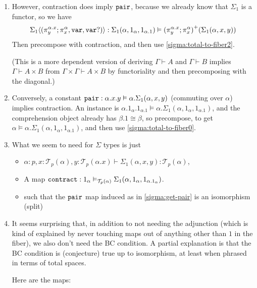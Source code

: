 \documentclass[10pt]{article}
\theoremstyle{definition}
\newcommand\TrPlus[2]{\ensuremath{{#1}^+(#2)}}
\newcommand\El[2]{\mathcal{T}_{#1}(#2)}
\newcommand\ap[2]{\ensuremath{#1 \langle #2 \rangle }}
\begin{document}
\begin{enumerate}
\item \label{sigma:get-pair} However, contraction does imply
  $\mathtt{pair}$, because we already know that $\Sigma_1$ is a functor, so
  we have
  \[
  \ap{\Sigma_1}{(\pi^{\alpha.x}_y;\pi^\alpha_x, \mtt{var}, \mtt{var}?)} :
  \Sigma_1(\alpha,1_\alpha,1_{\alpha.1}) \vDash \TrPlus{(\pi^{\alpha.x}_y;\pi^\alpha_x)}{\Sigma_1(\alpha,x,y)}
  \]
  Then precompose with contraction, and then use
  \ref{sigma:total-to-fiber2}.

  (This is a more dependent version of deriving $\Gamma \vdash A$ and
  $\Gamma \vdash B$ implies $\Gamma \vdash A \times B$ from $\Gamma
  \times \Gamma \vdash A \times B$ by functoriality and then
  precomposing with the diagonal.)
  
\item Conversely, a constant $\mathtt{pair} : \alpha.x.y \vDash
  \alpha.\Sigma_1(\alpha,x,y)$ (commuting over $\alpha$) implies
  contraction. An instance is $\alpha.1_{\alpha}.1_{\alpha.1} \vDash
  \alpha.\Sigma_1(\alpha,1_\alpha,1_{\alpha.1})$, and the comprehension
  object already has $\beta.1 \cong \beta$, so precompose, to get
  $\alpha \vDash \alpha.\Sigma_1(\alpha,1_\alpha,1_{\alpha.1})$, and
  then use \ref{sigma:total-to-fiber0}.

\item \label{sigma:spec} What we seem to need for $\Sigma$ types is just
  \begin{itemize}
  \item $\alpha : p, x : \El{p}{\alpha}, y : \El{p}{\alpha.x} \vdash \Sigma_1(\alpha,x,y) : \El{p}{\alpha}$,
  \item A map $\mtt{contract} : 1_\alpha \vDash_{\El{p}{\alpha}} \Sigma_1(\alpha,1_\alpha,1_{\alpha.{1_\alpha}})$.
  \item such that the $\mathtt{pair}$ map induced as in
    \ref{sigma:get-pair} is an isomorphism (split)
  \end{itemize}

\item It seems surprising that, in addition to not needing the
  adjunction (which is kind of explained by never touching maps out of
  anything other than $1$ in the fiber), we also don't need the BC
  condition.  A partial explanation is that the BC condition is
  (conjecture) true up to isomorphism, at least when phrased in terms of
  total spaces.

  Here are the maps:


\end{enumerate}
\end{document}
